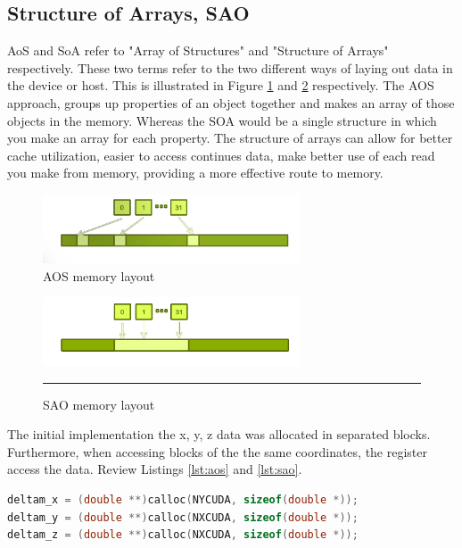 \subsection{Structure of Arrays, SAO}

AoS and SoA refer to "Array of Structures" and "Structure of Arrays" respectively. These two terms refer to the two different ways of laying out data in the device or host. This is illustrated in Figure \ref{fig:aos} and \ref{fig:sao} respectively. The AOS approach, groups up properties of an object together and makes an array of those objects in the memory. Whereas the SOA would be a single structure in which you make an array for each property. The structure of arrays can allow for better cache utilization, easier to access continues data, make better use of each read you make from memory, providing a more effective route to memory. 

\begin{figure}[htbp]
	\centering
		\includegraphics[width=0.68\textwidth]{Figures/aos.png}
		\smallskip
	\caption[Array of structures (AOS)]{AOS memory layout }
	\label{fig:aos}
\end{figure}


\begin{figure}[htbp]
	\centering
		\includegraphics[width=0.68\textwidth]{Figures/soa.png}
		\rule{35em}{0.2pt}
	\caption[Structure of Arrays (SAO)]{SAO memory layout}
	\label{fig:sao}
\end{figure}

The initial implementation the  x, y, z data was allocated in separated blocks. Furthermore, when accessing blocks of the the same coordinates, the register access the data. Review Listings \ref{lst:aos} and \ref{lst:sao}.

\begin{lstlisting}[language=C++, label={lst:aos}, caption={AOS implementation}]
deltam_x = (double **)calloc(NYCUDA, sizeof(double *));
deltam_y = (double **)calloc(NXCUDA, sizeof(double *));
deltam_z = (double **)calloc(NXCUDA, sizeof(double *));
\end{lstlisting}


